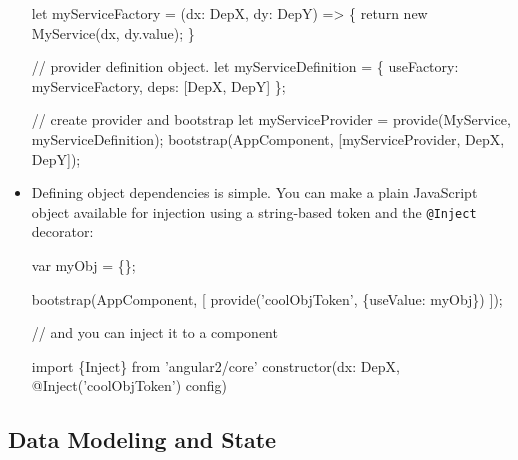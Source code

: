 \documentclass[12pt,]{article}
\newenvironment{Shaded}{}{}
\newcommand{\KeywordTok}[1]{\textcolor[rgb]{0.00,0.00,1.00}{{#1}}}
\newcommand{\CommentTok}[1]{\textcolor[rgb]{0.00,0.50,0.00}{{#1}}}
\newcommand{\FunctionTok}[1]{{#1}}
\newcommand{\NormalTok}[1]{{#1}}
\begin{document}
\begin{itemize}
\begin{Shaded}
\begin{Highlighting}[numbers=left,,]
\NormalTok{let myServiceFactory = (dx: DepX, dy: DepY) => \{}
  \KeywordTok{return} \KeywordTok{new} \FunctionTok{MyService}\NormalTok{(dx, dy.}\FunctionTok{value}\NormalTok{);}
\NormalTok{\}}

\CommentTok{// provider definition object.}
\NormalTok{let myServiceDefinition = \{}
   \NormalTok{useFactory: myServiceFactory,}
   \NormalTok{deps: [DepX, DepY]}
\NormalTok{\};}

\CommentTok{// create provider and bootstrap}
\NormalTok{let myServiceProvider = }\FunctionTok{provide}\NormalTok{(MyService, myServiceDefinition);}
\FunctionTok{bootstrap}\NormalTok{(AppComponent, [myServiceProvider, DepX, DepY]);}
\end{Highlighting}
\end{Shaded}
\item
  Defining object dependencies is simple. You can make a plain
  JavaScript object available for injection using a string-based token
  and the \texttt{@Inject} decorator:

\begin{Shaded}
\begin{Highlighting}[numbers=left,,]
\NormalTok{var myObj = \{\};}

\FunctionTok{bootstrap}\NormalTok{(AppComponent, [}
  \FunctionTok{provide}\NormalTok{('coolObjToken', \{useValue: myObj\})}
\NormalTok{]);}

\CommentTok{// and you can inject it to a component}

\KeywordTok{import} \NormalTok{\{Inject\} from 'angular2/core'}
\FunctionTok{constructor}\NormalTok{(dx: DepX, }\FunctionTok{@Inject}\NormalTok{('coolObjToken') config)}
\end{Highlighting}
\end{Shaded}
\end{itemize}

\subsection{Data Modeling and State}\label{data-modeling-and-state}
\end{document}
